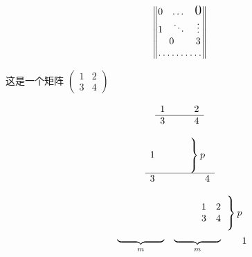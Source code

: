 \documentclass[8pt]{article}
\begin{document}
%	
%	
	
	\[
	\begin{Vmatrix}
		0 & \dots & \text{\Large 0}\\
		1 & \ddots & \vdots\\
		\multicolumn{2}{c}{\Huge 0} & 3 \\
		\hdotsfor{3}
	\end{Vmatrix} 
	\]
	
	
	
	这是一个矩阵
	\begin{math}
	\left( %
	\begin{smallmatrix}
		1 & 2 \\
		3 & 4 
	\end{smallmatrix}
	\right)
	\end{math}
	
	
	
	\[
	\begin{array}{r @{\hspace{30pt}} r}
		1 & 2 \\
		\hline
		3 & 4 \\
	\end{array}
	\]
	
	
	\[
	\begin{array}{r @{\hspace{30pt}} r}
		1 
		
		& 
		\begin{array}{l}
		
		\left. \rule{0mm}{7mm} \right \} p
		
		\end{array} 
		
		\\
		\hline
		3 & 4 \\
	\end{array}
	\]
	
	
	\[
	\begin{array}{r @{\hspace{-5pt}} r}
		\begin{array}{r r}
			1 & 2 \\
			3 & 4 \\	
		\end{array}
		&
		\begin{array}{l}
			\left. \rule{0mm}{7mm} \right \} p
		\end{array}
		
		\\ 
		
		\begin{array}{cc}
		\underbrace{\rule{17mm}{0mm}}_m &
		\underbrace{\rule{17mm}{0mm}}_m
		\end{array}
		
		&
		1
		\\
	\end{array}
	\]
	
\end{document}
